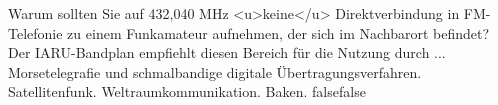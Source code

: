     {Warum sollten Sie auf 432,040 MHz <u>keine</u> Direktverbindung in FM-Telefonie zu einem Funkamateur aufnehmen, der sich im Nachbarort befindet? Der IARU-Bandplan empfiehlt diesen Bereich für die Nutzung durch ...}
    {Morsetelegrafie und schmalbandige digitale Übertragungsverfahren.}
    {Satellitenfunk.}
    {Weltraumkommunikation.}
    {Baken.}
    {false}{false}